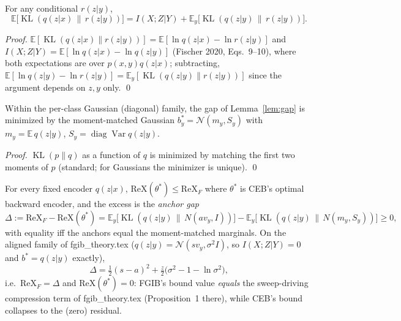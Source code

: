 \begin{lemma}\label{lem:gap}
For any conditional $r(z|y)$,
\begin{equation}
\mathbb{E}\big[\operatorname{KL}(q(z|x)\,\|\,r(z|y))\big]
= I(X;Z|Y) + \mathbb{E}_y\big[\operatorname{KL}(q(z|y)\,\|\,r(z|y))\big] .
\label{eq:gap}
\end{equation}
\end{lemma}

\begin{proof}
$\mathbb{E}[\operatorname{KL}(q(z|x)\|r(z|y))] = \mathbb{E}[\ln q(z|x) - \ln r(z|y)]$
and $I(X;Z|Y) = \mathbb{E}[\ln q(z|x) - \ln q(z|y)]$ (Fischer 2020, Eqs.~9--10), where
both expectations are over $p(x,y)q(z|x)$; subtracting,
$\mathbb{E}[\ln q(z|y) - \ln r(z|y)] = \mathbb{E}_y[\operatorname{KL}(q(z|y)\|r(z|y))]$
since the argument depends on $z, y$ only. \hfill\qed
\end{proof}

\begin{lemma}\label{lem:mm}
Within the per-class Gaussian (diagonal) family, the gap of Lemma~\ref{lem:gap} is
minimized by the moment-matched Gaussian $b^*_y = \mathcal{N}(m_y, S_y)$ with
$m_y = \mathbb{E}\,q(z|y)$, $S_y = \operatorname{diag}\operatorname{Var} q(z|y)$.
\end{lemma}

\begin{proof}
$\operatorname{KL}(p\|q)$ as a function of $q$ is minimized by matching the first two
moments of $p$ (standard; for Gaussians the minimizer is unique). \hfill\qed
\end{proof}

\begin{proposition}\label{prop:ordering}
For every fixed encoder $q(z|x)$,
$\mathrm{ReX}(\theta^*) \le \mathrm{ReX}_F$ where $\theta^*$ is CEB's optimal backward
encoder, and the excess is the \emph{anchor gap}
\begin{equation}
\Delta := \mathrm{ReX}_F - \mathrm{ReX}(\theta^*)
= \mathbb{E}_y\big[\operatorname{KL}(q(z|y)\,\|\,N(a v_y, I))\big]
- \mathbb{E}_y\big[\operatorname{KL}(q(z|y)\,\|\,N(m_y, S_y))\big] \ge 0 ,
\label{eq:anchor-gap}
\end{equation}
with equality iff the anchors equal the moment-matched marginals.
On the aligned family of fgib\_theory.tex ($q(z|y) = \mathcal{N}(s v_y, \sigma^2 I)$, so
$I(X;Z|Y) = 0$ and $b^* = q(z|y)$ exactly),
\begin{equation}
\Delta = \tfrac{1}{2}(s-a)^2 + \tfrac{z}{2}\big(\sigma^2 - 1 - \ln\sigma^2\big) ,
\label{eq:aligned-gap}
\end{equation}
i.e.\ $\mathrm{ReX}_F = \Delta$ and $\mathrm{ReX}(\theta^*) = 0$: FGIB's bound value
\emph{equals} the sweep-driving compression term of fgib\_theory.tex
(Proposition~1 there), while CEB's bound collapses to the (zero) residual.
\end{proposition}


